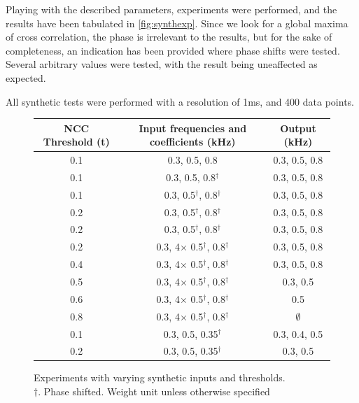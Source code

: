 Playing with the described parameters, experiments were performed, and the
results have been tabulated in \autoref{fig:synthexp}. Since we look for a
global maxima of cross correlation, the phase is irrelevant to the results, but
for the sake of completeness, an indication has been provided where phase shifts
were tested. Several arbitrary values were tested, with the result being
uneaffected as expected.

All synthetic tests were performed with a resolution of 1ms, and 400 data points.

\begin{figure}[ht]
    \centering
    \def\arraystretch{1.5}
    \setlength\tabcolsep{2em}
    \begin{tabular}{c | c | c}
        NCC Threshold (t)   & Input frequencies and coefficients (kHz)      & Output (kHz)  \\ \hline
        0.1                 & 0.3, 0.5, 0.8                                 & 0.3, 0.5, 0.8 \\
        0.1                 & 0.3, 0.5, 0.8$^\dagger$                       & 0.3, 0.5, 0.8 \\
        0.1                 & 0.3, 0.5$^\dagger$, 0.8$^\dagger$             & 0.3, 0.5, 0.8 \\
        0.2                 & 0.3, 0.5$^\dagger$, 0.8$^\dagger$             & 0.3, 0.5, 0.8 \\
        0.2                 & 0.3, 0.5$^\dagger$, 0.8$^\dagger$             & 0.3, 0.5, 0.8 \\
        0.2                 & 0.3, 4$\times$ 0.5$^\dagger$, 0.8$^\dagger$   & 0.3, 0.5, 0.8 \\
        0.4                 & 0.3, 4$\times$ 0.5$^\dagger$, 0.8$^\dagger$   & 0.3, 0.5, 0.8 \\
        0.5                 & 0.3, 4$\times$ 0.5$^\dagger$, 0.8$^\dagger$   & 0.3, 0.5      \\
        0.6                 & 0.3, 4$\times$ 0.5$^\dagger$, 0.8$^\dagger$   & 0.5           \\
        0.8                 & 0.3, 4$\times$ 0.5$^\dagger$, 0.8$^\dagger$   & $\emptyset$   \\
        0.1                 & 0.3, 0.5, 0.35$^\dagger$                      & 0.3, 0.4, 0.5 \\
        0.2                 & 0.3, 0.5, 0.35$^\dagger$                      & 0.3, 0.5     
    \end{tabular}
    \captionsetup{justification=centering}
    \caption{Experiments with varying synthetic inputs and thresholds.\\
    $\dagger.$ Phase shifted. Weight unit unless otherwise specified}
    \label{fig:synthexp}

\end{figure}

